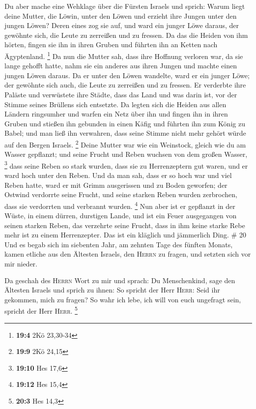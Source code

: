  Du aber mache eine Wehklage über die Fürsten Israels
 und sprich: Warum liegt deine Mutter, die Löwin, unter
den Löwen und erzieht ihre Jungen unter den jungen Löwen? 
Deren eines zog sie auf, und ward ein junger Löwe daraus, der gewöhnte
sich, die Leute zu zerreißen und zu fressen.  Da das die
Heiden von ihm hörten, fingen sie ihn in ihren Gruben und führten ihn an
Ketten nach Ägyptenland. \footnote{\textbf{19:4} 2Kö 23,30-34}
 Da nun die Mutter sah, dass ihre Hoffnung verloren war,
da sie lange gehofft hatte, nahm sie ein anderes aus ihren Jungen und
machte einen jungen Löwen daraus.  Da er unter den Löwen
wandelte, ward er ein junger Löwe; der gewöhnte sich auch, die Leute zu
zerreißen und zu fressen.  Er verderbte ihre Paläste und
verwüstete ihre Städte, dass das Land und was darin ist, vor der Stimme
seines Brüllens sich entsetzte.  Da legten sich die Heiden
aus allen Ländern ringsumher und warfen ein Netz über ihn und fingen ihn
in ihren Gruben  und stießen ihn gebunden in einen Käfig
und führten ihn zum König zu Babel; und man ließ ihn verwahren, dass
seine Stimme nicht mehr gehört würde auf den Bergen Israels. \footnote{\textbf{19:9}
  2Kö 24,15}  Deine Mutter war wie ein Weinstock, gleich
wie du am Wasser gepflanzt; und seine Frucht und Reben wuchsen von dem
großen Wasser, \footnote{\textbf{19:10} Hes 17,6}  dass
seine Reben so stark wurden, dass sie zu Herrenzeptern gut waren, und er
ward hoch unter den Reben. Und da man sah, dass er so hoch war und viel
Reben hatte,  ward er mit Grimm ausgerissen und zu Boden
geworfen; der Ostwind verdorrte seine Frucht, und seine starken Reben
wurden zerbrochen, dass sie verdorrten und verbrannt wurden. \footnote{\textbf{19:12}
  Hes 15,4}  Nun aber ist er gepflanzt in der Wüste, in
einem dürren, durstigen Lande,  und ist ein Feuer
ausgegangen von seinen starken Reben, das verzehrte seine Frucht, dass
in ihm keine starke Rebe mehr ist zu einem Herrenzepter. Das ist ein
kläglich und jämmerlich Ding. \# 20  Und es begab sich im
siebenten Jahr, am zehnten Tage des fünften Monats, kamen etliche aus
den Ältesten Israels, den \textsc{Herrn} zu fragen, und setzten sich vor
mir nieder.

 Da geschah des \textsc{Herrn} Wort zu mir und sprach:
 Du Menschenkind, sage den Ältesten Israels und sprich zu
ihnen: So spricht der Herr \textsc{Herr}: Seid ihr gekommen, mich zu
fragen? So wahr ich lebe, ich will von euch ungefragt sein, spricht der
Herr \textsc{Herr}. \footnote{\textbf{20:3} Hes 14,3}

